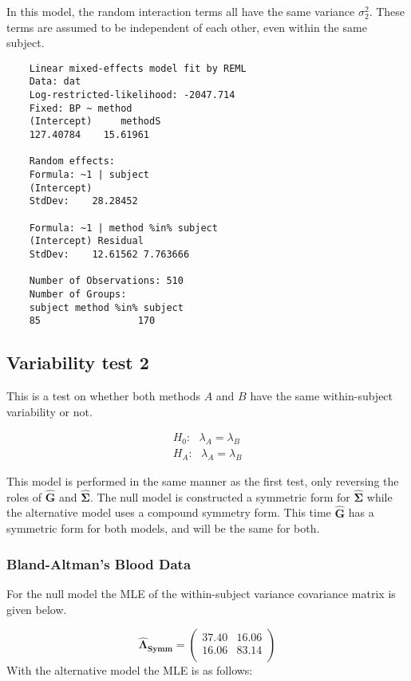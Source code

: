 \documentclass[12pt, a4paper]{report}
\theoremstyle{plain}
\theoremstyle{definition}
\theoremstyle{remark}
\begin{document}
	In this model, the random interaction terms all have the same variance $\sigma^2_{2}$. These terms are assumed to be independent of each other, even
	within the same subject.
	
	\begin{verbatim}
	Linear mixed-effects model fit by REML
	Data: dat
	Log-restricted-likelihood: -2047.714
	Fixed: BP ~ method
	(Intercept)     methodS
	127.40784    15.61961
	
	Random effects:
	Formula: ~1 | subject
	(Intercept)
	StdDev:    28.28452
	
	Formula: ~1 | method %in% subject
	(Intercept) Residual
	StdDev:    12.61562 7.763666
	
	Number of Observations: 510
	Number of Groups:
	subject method %in% subject
	85                 170
	\end{verbatim}

\subsection{Variability test 2}
	
	This is a test on whether both methods $A$ and $B$ have the same within-subject variability or not.
	
	\begin{eqnarray}
	H_{0}: \mbox{ }\lambda_{A}  = \lambda_{B} \\
	H_{A}: \mbox{ }\lambda_{A}  = \lambda_{B}
	\end{eqnarray}
	
	This model is performed in the same manner as the first test, only reversing the roles of $\boldsymbol{\hat{G}}$ and $\boldsymbol{\hat{\Sigma}}$. The null model is constructed  a symmetric form for $\boldsymbol{\hat{\Sigma}}$ while the alternative model uses a compound symmetry form. This time $\boldsymbol{\hat{G}}$ has a symmetric form for both models, and will be the same for both.
	
	
	\subsubsection{Bland-Altman's Blood Data}
	For the null model the MLE of the within-subject variance covariance matrix is given below.
	
	\begin{equation}
	\boldsymbol{\hat{\Lambda}_{Symm}} = \left( \begin{array}{cc}
	37.40 & 16.06  \\
	16.06 & 83.14  \\
	\end{array}\right)
	\end{equation}
	With the alternative model the MLE is as follows:
	
\end{document}
